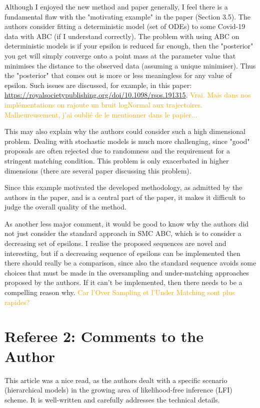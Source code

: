 \documentclass[10.5pt]{article}
\def\al#1{\textcolor{orange}{#1}}
\begin{document}
Although I enjoyed the new method and paper generally, I feel there is a fundamental flaw with the "motivating example" in the paper (Section 3.5).  The authors consider fitting a deterministic model (set of ODEs) to some Covid-19 data with ABC (if I understand correctly).  The problem with using ABC on deterministic models is if your epsilon is reduced far enough, then the "posterior" you get will simply converge onto a point mass at the parameter value that minimises the distance to the observed data (assuming a unique minimiser).  Thus the "posterior" that comes out is more or less meaningless for any value of epsilon.  Such issues are discussed, for example, in this paper:  \url{https://royalsocietypublishing.org/doi/10.1098/rsos.191315}. \al{Vrai. Mais dans nos implémentations on rajoute un bruit logNormal aux trajectoires. Malheureusement, j'ai oublié de le mentionner dans le papier...}

This may also explain why the authors could consider such a high dimensional problem.  Dealing with stochastic models is much more challenging, since "good" proposals are often rejected due to randomness and the requirement for a stringent matching condition.  This problem is only exacerbated in higher dimensions (there are several paper discussing this problem).

Since this example motivated the developed methodology, as admitted by the authors in the paper, and is a central part of the paper, it makes it difficult to judge the overall quality of the method. 

As another less major comment, it would be good to know why the authors did not just consider the standard approach in SMC ABC, which is to consider a decreasing set of epsilons.  I realise the proposed sequences are novel and interesting, but if a decreasing sequence of epsilons can be implemented then there should really be a comparison, since also the standard sequence avoids some choices that must be made in the oversampling and under-matching approaches proposed by the authors.  If it can't be implemented, then there needs to be a compelling reason why. \al{Car l'Over Sampling et l'Under Matching sont plus rapides?}


\section*{Referee 2: Comments to the Author}

This article was a nice read, as the authors dealt with a specific scenario (hierarchical models) in the growing area of likelihood-free inference (LFI) scheme. It is well-written and carefully addresses the technical details. 
\end{document}
